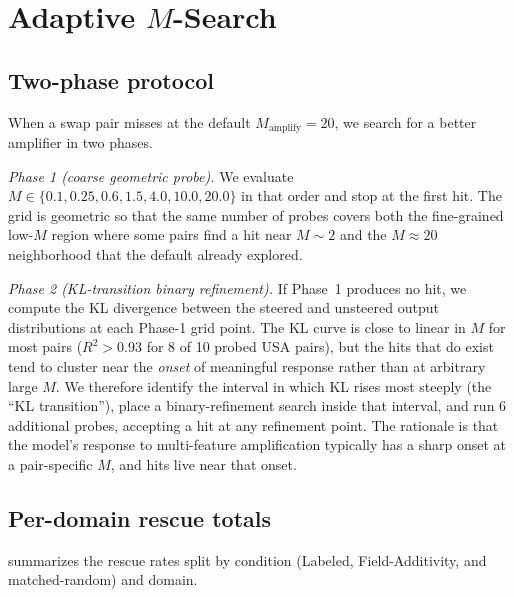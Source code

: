 \section{Adaptive $M$-Search}
\label{appx:msearch}

\subsection{Two-phase protocol}

When a swap pair misses at the default $M_{\mathrm{amplify}}{=}20$, we search for a better amplifier in two phases.

\emph{Phase 1 (coarse geometric probe).} We evaluate $M \in \{0.1, 0.25, 0.6, 1.5, 4.0, 10.0, 20.0\}$ in that order and stop at the first hit. The grid is geometric so that the same number of probes covers both the fine-grained low-$M$ region where some pairs find a hit near $M{\sim}2$ and the $M\approx 20$ neighborhood that the default already explored.

\emph{Phase 2 (KL-transition binary refinement).} If Phase~1 produces no hit, we compute the KL divergence between the steered and unsteered output distributions at each Phase-1 grid point. The KL curve is close to linear in $M$ for most pairs ($R^2 > 0.93$ for 8 of 10 probed USA pairs), but the hits that do exist tend to cluster near the \emph{onset} of meaningful response rather than at arbitrary large $M$. We therefore identify the interval in which KL rises most steeply (the ``KL transition''), place a binary-refinement search inside that interval, and run 6 additional probes, accepting a hit at any refinement point. The rationale is that the model's response to multi-feature amplification typically has a sharp onset at a pair-specific $M$, and hits live near that onset.

\subsection{Per-domain rescue totals}

 summarizes the rescue rates split by condition (Labeled, Field-Additivity, and matched-random) and domain.

